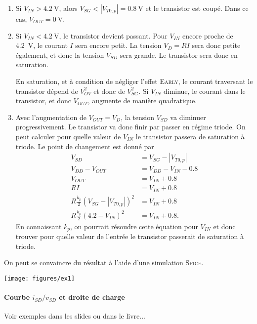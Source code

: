 \begin{enumerate}
	\item Si $V_{IN} > \SI{4.2}{\volt}$, alors $V_{SG} < |V_{T0,p}| = \SI{0.8}{\volt}$
	et le transistor est coupé. Dans ce cas, $V_{OUT} = \SI{0}{\volt}$.
	\item Si $V_{IN} < \SI{4.2}{\volt}$, le transistor devient passant. Pour
	$V_{IN}$ encore proche de \SI{4.2}{\volt}, le courant $I$ sera encore
	petit. La tension $V_D = RI$ sera donc petite également, et donc la tension
	$V_{SD}$ sera grande. Le transistor sera donc en saturation.
	
	En saturation, et à condition de négliger l'effet \textsc{Early}, le courant
	traversant le transistor dépend de $V_{OV}^2$ et donc de $V_{SG}^2$. Si $V_{IN}$
	diminue, le courant dans le transistor, et donc $V_{OUT}$, augmente de manière
	quadratique.
	\item Avec l'augmentation de $V_{OUT} = V_D$, la tension $V_{SD}$ va diminuer
	progressivement. Le transistor va donc finir par passer en régime triode.
	On peut calculer pour quelle valeur de $V_{IN}$ le transistor passera de saturation
	à triode. Le point de changement est donné par
	\begin{align*}
		 V_{SD} & = V_{SG} - |V_{T0,p}| \\
		 V_{DD} - V_{OUT} & = V_{DD} - V_{IN} - 0.8 \\
		 V_{OUT} & = V_{IN} + 0.8 \\
		 RI & = V_{IN} + 0.8 \\
		 R\frac{k_p}{2}(V_{SG} - |V_{T0,p}|)^2 & = V_{IN} + 0.8 \\
		 R\frac{k_p}{2}(4.2 - V_{IN})^2 & = V_{IN} + 0.8.
	\end{align*}
	En connaissant $k_p$, on pourrait résoudre cette équation pour $V_{IN}$ et donc
	trouver pour quelle valeur de l'entrée le transistor passerait de saturation à triode.
\end{enumerate}

On peut se convaincre du résultat à l'aide d'une simulation \textsc{Spice}.

\begin{center}
	\texttt{[image: figures/ex1]}
\end{center}
	
\paragraph{Courbe $i_{SD}/v_{SD}$ et droite de charge}
Voir exemples dans les slides ou dans le livre...

